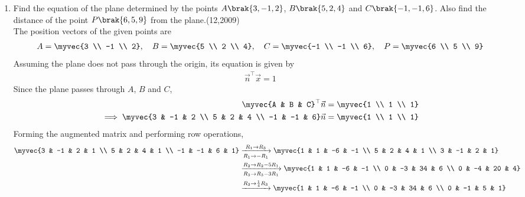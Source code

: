 \begin{enumerate}[label=\thesubsection.\arabic*, ref=\thesubsection.\theenumi]
 \item Find the equation of the plane determined by the points $A\brak{3, -1, 2}$, $B\brak{5, 2, 4}$ and $C\brak{-1, -1, 6}$. Also find the distance of the point $P\brak{6, 5, 9}$ from the plane.\hfill{(12,2009)} \\
 \solution
 The position vectors of the given points are
 \begin{align}
 	A = \myvec{3 \\ -1 \\ 2}, \quad B = \myvec{5 \\ 2 \\ 4}, \quad C = \myvec{-1 \\ -1 \\ 6}, \quad P = \myvec{6 \\ 5 \\ 9}
 \end{align}
 Assuming the plane does not pass through the origin, its equation is given by
 \begin{align}
 	\vec{n}^{\top}\vec{x} = 1
 \end{align}
 Since the plane passes through $A$, $B$ and $C$,
 \begin{align}
 	\myvec{A & B & C}^{\top}\vec{n} &= \myvec{1 \\ 1 \\ 1} \\
 	\implies \myvec{3 & -1 & 2 \\ 5 & 2 & 4 \\ -1 & -1 & 6}\vec{n} &= \myvec{1 \\ 1 \\ 1}
 \end{align}
 Forming the augmented matrix and performing row operations,
 \begin{align}
 	\myvec{3 & -1 & 2 & 1 \\ 5 & 2 & 4 & 1 \\ -1 & -1 & 6 & 1}
 	&\xrightarrow[R_1 \to -R_1]{R_1 \to R_3 }
 	\myvec{1 & 1 & -6 & -1 \\ 5 & 2 & 4 & 1 \\ 3 & -1 & 2 & 1} \\
 	&\xrightarrow[R_3 \to R_3 - 3R_1]{R_2 \to R_2 - 5R_1}
 	\myvec{1 & 1 & -6 & -1 \\ 0 & -3 & 34 & 6 \\ 0 & -4 & 20 & 4} \\
 	&\xrightarrow{R_3 \to \frac{1}{4}R_3}
 	\myvec{1 & 1 & -6 & -1 \\ 0 & -3 & 34 & 6 \\ 0 & -1 & 5 & 1} \\

\end{align}
\end{enumerate}
